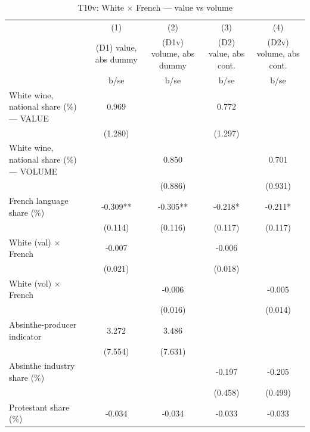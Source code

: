 \begin{table}[htbp]\centering
\def\sym#1{\ifmmode^{#1}\else\(^{#1}\)\fi}
\caption{T10v: White $\times$ French — value vs volume \label{tab:T10v}}
\begin{tabular}{l*{4}{c}}
\toprule
            &\multicolumn{1}{c}{(1)}&\multicolumn{1}{c}{(2)}&\multicolumn{1}{c}{(3)}&\multicolumn{1}{c}{(4)}\\
            &\multicolumn{1}{c}{(D1) value, abs dummy}&\multicolumn{1}{c}{(D1v) volume, abs dummy}&\multicolumn{1}{c}{(D2) value, abs cont.}&\multicolumn{1}{c}{(D2v) volume, abs cont.}\\
            &        b/se   &        b/se   &        b/se   &        b/se   \\
\midrule
White wine, national share (\%) — VALUE&       0.969   &               &       0.772   &               \\
            &     (1.280)   &               &     (1.297)   &               \\
White wine, national share (\%) — VOLUME&               &       0.850   &               &       0.701   \\
            &               &     (0.886)   &               &     (0.931)   \\
French language share (\%)&      -0.309** &      -0.305** &      -0.218*  &      -0.211*  \\
            &     (0.114)   &     (0.116)   &     (0.117)   &     (0.117)   \\
White (val) $\times$ French&      -0.007   &               &      -0.006   &               \\
            &     (0.021)   &               &     (0.018)   &               \\
White (vol) $\times$ French&               &      -0.006   &               &      -0.005   \\
            &               &     (0.016)   &               &     (0.014)   \\
Absinthe-producer indicator&       3.272   &       3.486   &               &               \\
            &     (7.554)   &     (7.631)   &               &               \\
Absinthe industry share (\%)&               &               &      -0.197   &      -0.205   \\
            &               &               &     (0.458)   &     (0.499)   \\
Protestant share (\%)&      -0.034   &      -0.034   &      -0.033   &      -0.033   \\

\end{tabular}
\end{table}

